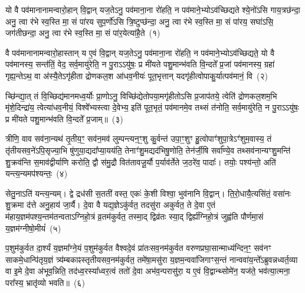\setcounter{anuvakam}{0}
यो वै पव॑मानानामन्वारो॒हान् वि॒द्वान् यज॒ते\-ऽनु॒ पव॑माना॒ना रो॑हति॒ न पव॑माने॒भ्यो\-ऽव॑च्छिद्यते श्ये॒नो॑\-ऽसि गाय॒त्रछ॑न्दा॒ अनु॒ त्वा र॑भे स्व॒स्ति मा॒ सं पा॑रय सुप॒र्णो॑\-ऽसि त्रि॒ष्टुप्छ॑न्दा॒ अनु॒ त्वा र॑भे स्व॒स्ति मा॒ सं पा॑रय॒ सघा॑ऽसि॒ जग॑तीछन्दा॒ अनु॒ त्वा र॑भे स्व॒स्ति मा॒ सं पा॑र॒येत्या॑है॒ते~(१)\ip

वै पव॑मानानामन्वारो॒हास्तान् य ए॒वं वि॒द्वान् यज॒ते\-ऽनु॒ पव॑माना॒ना रो॑हति॒ न पव॑माने॒भ्यो\-ऽव॑च्छिद्यते॒ यो वै पव॑मानस्य॒ सन्त॑तिं॒ वेद॒ सर्व॒मायु॑रेति॒ न पु॒रा\-ऽऽ\-यु॑षः॒ प्र मी॑यते पशु॒मान्भ॑वति वि॒न्दते᳚ प्र॒जां पव॑मानस्य॒ ग्रहा॑ गृह्य॒न्ते\-ऽथ॒ वा अ॑स्यै॒ते\-ऽगृ॑हीता द्रोणकल॒श आ॑धव॒नीयः॑ पूत॒भृत्तान् यदगृ॑हीत्वोपाकु॒र्यात्पव॑मानं॒ वि~(२)\ip

च्छि॑न्द्या॒त् तं वि॒च्छिद्य॑मानमध्व॒र्योः प्रा॒णो\-ऽनु॒ विच्छि॑द्येतोप\-या॒मगृ॑हीतो\-ऽसि प्र॒जा\-प॑तये॒ त्वेति॑ द्रोणकल॒शम॒भि मृ॑शे॒दिन्द्रा॑य॒ त्वेत्या॑धव॒नीयं॒ विश्वे᳚भ्यस्त्वा दे॒वेभ्य॒ इति॑ पूत॒भृतं॒ पव॑मानमे॒व तथ्सं त॑नोति॒ सर्व॒मायु॑रेति॒ न पु॒रा\-ऽऽ\-यु॑षः॒ प्र मी॑यते पशु॒मान्भ॑वति वि॒न्दते᳚ प्र॒जाम्॥~(३)\ip

{\anuvakamend[{ए॒ते वि द्विच॑त्वारिꣳशच्च}]}

त्रीणि॒ वाव सव॑ना॒न्यथ॑ तृ॒तीय॒ꣳ॒ सव॑न॒मव॑ लुम्पन्त्यन॒ꣳ॒शु कु॒र्वन्त॑ उपा॒ꣳ॒शुꣳ हु॒त्वोपाꣳ॑शुपा॒त्रे\-ऽꣳ॑शुम॒वास्य॒ तं तृ॑तीय\-सव॒ने॑\-ऽपि॒सृज्या॒भि षु॑णुया॒द्यदा᳚प्या॒यय॑ति॒ तेनाꣳ॑शु॒मद्यद॑भिषु॒णोति॒ तेन॑र्जी॒षि सर्वा᳚ण्ये॒व तथ्सव॑नान्यꣳशु॒मन्ति॑ शु॒क्रव॑न्ति स॒माव॑द्वीर्याणि करोति॒ द्वौ स॑मु॒द्रौ वित॑तावजू॒र्यौ प॒र्याव॑र्तेते ज॒ठरे॑व॒ पादाः᳚। तयोः॒ पश्य॑न्तो॒ अति॑ यन्त्य॒न्यमप॑श्यन्तः॒~(४)\ip

सेतु॒ना\-ऽति॑ यन्त्य॒न्यम्। द्वे द्रध॑सी स॒तती॑ वस्त॒ एकः॑ के॒शी विश्वा॒ भुव॑नानि वि॒द्वान्। ति॒रो॒धायै॒त्यसि॑तं॒ वसा॑नः शु॒क्रमा द॑त्ते अनु॒हाय॑ जा॒र्यै। दे॒वा वै यद्य॒ज्ञे\-ऽकु॑र्वत॒ तदसु॑रा अकुर्वत॒ ते दे॒वा ए॒तं म॑हाय॒ज्ञम॑पश्य॒न्तम॑तन्वता\-ऽ\-ग्निहो॒त्रं व्र॒तम॑कुर्वत॒ तस्मा॒द् द्विव्र॑तः स्या॒द् द्विर्\mbox{}ह्य॑ग्निहो॒त्रं जुह्व॑ति पौर्णमा॒सं य॒ज्ञम॑ग्नीषो॒मीयं॑~(५)\ip

प॒शुम॑कुर्वत दा॒र्श्यं य॒ज्ञमा᳚ग्ने॒यं प॒शुम॑कुर्वत वैश्वदे॒वं प्रा॑तःसव॒नम॑कुर्वत वरुण\-प्रघा॒सान्माध्य॑न्दिन॒ꣳ॒ सव॑नꣳ साक\-मे॒धान्पि॑तृय॒ज्ञं त्र्य॑म्बकाꣴस्तृतीय\-सव॒नम॑कुर्वत॒ तमे॑षा॒मसु॑रा य॒ज्ञम॒न्व\-वा॑जिगाꣳ\-स॒न्तं नान्ववा॑य॒न्ते᳚\-ऽब्रुवन्नध्वर्त॒व्या वा इ॒मे दे॒वा अ॑भूव॒न्निति॒ तद॑ध्व॒रस्या᳚ध्वर॒त्वं ततो॑ दे॒वा अभ॑व॒न्परासु॑रा॒ य ए॒वं वि॒द्वान्थ्सोमे॑न॒ यज॑ते॒ भव॑त्या॒त्मना॒ परा᳚स्य॒ भ्रातृ॑व्यो भवति॥~(६)\ip

